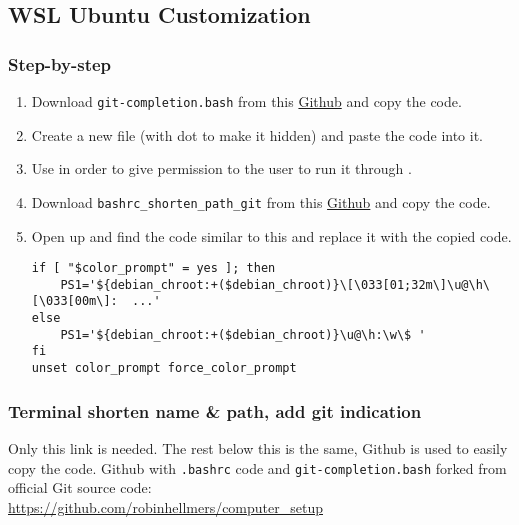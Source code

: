\subsection{WSL Ubuntu Customization}
\subsubsection{Step-by-step}

\begin{enumerate}
    \item Download \texttt{git-completion.bash} from this \href{https://github.com/robinhellmers/computer_setup/tree/master/bash_path}{Github} and copy the code.
    
    \item Create a new file  (with dot to make it hidden) and paste the code into it.
    
    \item Use  in order to give permission to the user to run it through .
    
    \item Download \texttt{bashrc\_shorten\_path\_git} from this \href{https://github.com/robinhellmers/computer_setup/tree/master/bash_path}{Github} and copy the code.
    
    \item Open up  and find the code similar to this and replace it with the copied code.
\begin{verbatim}
if [ "$color_prompt" = yes ]; then
    PS1='${debian_chroot:+($debian_chroot)}\[\033[01;32m\]\u@\h\[\033[00m\]:  ...'
else
    PS1='${debian_chroot:+($debian_chroot)}\u@\h:\w\$ '
fi
unset color_prompt force_color_prompt
\end{verbatim}
    
    
\end{enumerate}

\subsubsection{Terminal shorten name \& path, add git indication}
Only this link is needed. The rest below this is the same, Github is used to easily copy the code. Github with \texttt{.bashrc} code and \texttt{git-completion.bash} forked from official Git source code:\\
\url{https://github.com/robinhellmers/computer_setup}

